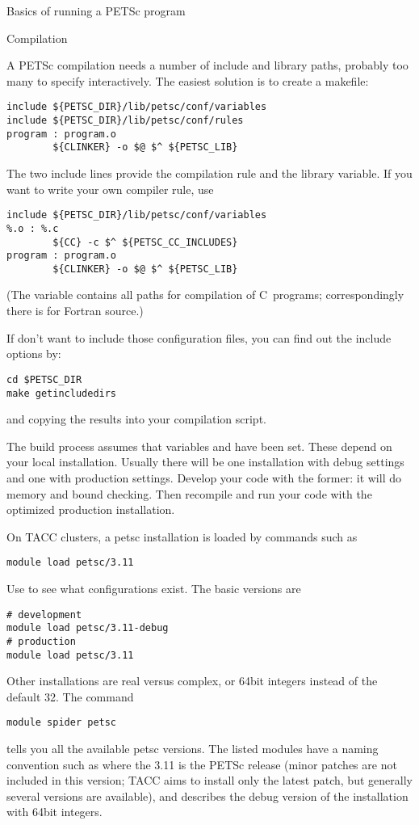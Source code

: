  {Basics of running a PETSc program}

 {Compilation}

A PETSc compilation needs a number of include and library paths,
probably too many to specify interactively. The easiest solution is to
create a makefile:
\begin{verbatim}
include ${PETSC_DIR}/lib/petsc/conf/variables
include ${PETSC_DIR}/lib/petsc/conf/rules
program : program.o
        ${CLINKER} -o $@ $^ ${PETSC_LIB}
\end{verbatim}
The two include lines provide the compilation rule and the library
variable. If you want to write your own compiler rule, use
\begin{verbatim}
include ${PETSC_DIR}/lib/petsc/conf/variables
%.o : %.c
        ${CC} -c $^ ${PETSC_CC_INCLUDES}
program : program.o
        ${CLINKER} -o $@ $^ ${PETSC_LIB}
\end{verbatim}
(The  variable contains all paths for
compilation of C~programs; correspondingly there is
 for Fortran source.)

If don't want to include those configuration files, you can find out
the include options by:
\begin{verbatim}
cd $PETSC_DIR
make getincludedirs
\end{verbatim}
and copying the results into your compilation script.

The build process assumes that variables  and
 have been set. These depend on your local
installation. Usually there will be one installation with debug
settings and one with production settings. Develop your code with the
former: it will do memory and bound checking. Then recompile and run
your code with the optimized production installation.

\begin{taccnote}
  On TACC clusters, a petsc installation is loaded by commands such as
\begin{verbatim}
module load petsc/3.11
\end{verbatim}
Use  to see what configurations exist. The basic
versions are
\begin{verbatim}
# development
module load petsc/3.11-debug
# production
module load petsc/3.11
\end{verbatim}
Other installations are real versus complex, or 64bit integers instead
of the default 32. The command 
\begin{verbatim}
module spider petsc
\end{verbatim}
tells you all the
available petsc versions. The listed modules have a naming convention
such as  where the 3.11 is the PETSc release (minor
patches are not included in this version; TACC aims to install only
the latest patch, but generally several versions are available), and
 describes the debug version of the installation with 64bit
integers.
\end{taccnote}

